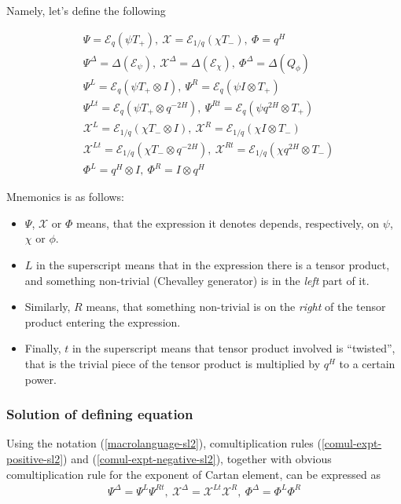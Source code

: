 \documentclass{article}
\newcommand{\lb}{\left (}
\newcommand{\rb}{\right )}
\newcommand{\be}{\begin{eqnarray}}
\newcommand{\ee}{\end{eqnarray}}
\newcommand {\?}{\textit{???}}
\newcommand{\me}[0]{\mathcal{E}}
\def\Chi{\mathcal{X}}
\newcommand{\EChiL}[0]{\Chi^L}
\newcommand{\EChiR}[0]{\Chi^R}
\newcommand{\EChiLT}[0]{\Chi^{Lt}}
\newcommand{\EChiRT}[0]{\Chi^{Rt}}
\newcommand{\EChiD}[0]{\Chi^\Delta}
\newcommand{\EPsiL}[0]{\Psi^L}
\newcommand{\EPsiR}[0]{\Psi^R}
\newcommand{\EPsiLT}[0]{\Psi^{Lt}}
\newcommand{\EPsiRT}[0]{\Psi^{Rt}}
\newcommand{\EPsiD}[0]{\Psi^\Delta}
\newcommand{\QPhiL}[0]{\Phi^L}
\newcommand{\QPhiR}[0]{\Phi^R}
\newcommand{\QPhiD}[0]{\Phi^\Delta}
\newcommand{\comul}[1]{\Delta \lb #1 \rb}
\newcommand{\delabel}[1]{(\ref{#1})}
\begin{document}
Namely, let's define the following

\be
& \Psi = \me_q \lb \psi T_+ \rb,\ \Chi = \me_{1/q} \lb \chi T_- \rb,\ \Phi = q^H \nonumber \\
& \EPsiD = \comul{\me_\psi},\ \EChiD = \comul{\me_\chi},\ \QPhiD = \comul{Q_\phi} \nonumber \\
& \EPsiL = \me_q \lb \psi T_+ \otimes I\rb,\ \EPsiR = \me_q \lb \psi I \otimes T_+ \rb \nonumber \\
\label{macrolanguage-sl2}
& \EPsiLT = \me_q \lb \psi T_+ \otimes q^{-2H}\rb,\ \EPsiRT = \me_q \lb \psi q^{2H} \otimes T_+ \rb \\
& \EChiL = \me_{1/q} \lb \chi T_- \otimes I\rb,\ \EChiR = \me_{1/q} \lb \chi I \otimes T_- \rb \nonumber \\
& \EChiLT = \me_{1/q} \lb \chi T_- \otimes q^{-2H}\rb,\ \EChiRT = \me_{1/q} \lb \chi q^{2H} \otimes T_- \rb \nonumber \\
& \QPhiL = q^H \otimes I,\ \QPhiR = I \otimes q^H \nonumber 
\ee

Mnemonics is as follows:
\begin{itemize}
\item $\Psi$, $\Chi$ or $\Phi$ means, that the expression it denotes depends, respectively,
on $\psi$, $\chi$ or $\phi$.
\item $L$ in the superscript means that in the expression there is a tensor product,
and something non-trivial (Chevalley generator) is in the {\it left} part of it.
\item Similarly, $R$ means, that something non-trivial is on the {\it right} of the tensor product entering the expression.
\item Finally, $t$ in the superscript means that tensor product involved is ``twisted'', that is the trivial piece
of the tensor product is multiplied by $q^H$ to a certain power.
\end{itemize}

\subsubsection{Solution of defining equation}

Using the notation \delabel{macrolanguage-sl2}, comultiplication rules \delabel{comul-expt-positive-sl2} and
\delabel{comul-expt-negative-sl2}, together with obvious comultiplication rule for the exponent of Cartan element,
can be expressed as
\be
\EPsiD = \EPsiL \EPsiRT,\ \EChiD = \EChiLT \EChiR,\ \QPhiD = \QPhiL \QPhiR
\ee
\end{document}
